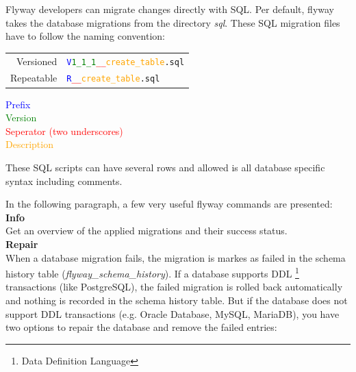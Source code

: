 

%
Flyway developers can migrate changes directly with SQL. Per default, flyway takes the database migrations from the directory \textit{sql}.
These SQL migration files have to follow the naming convention:\\

\begin{center}
\begin{tabularx}{8cm}{r l}
Versioned & \texttt{\textcolor{blue}{V}\textcolor{green}{1\_1\_1}\textcolor{red}{\_\_}\textcolor{orange}{create\_table}.sql}\\
Repeatable & \texttt{\textcolor{blue}{R}\textcolor{red}{\_\_}\textcolor{orange}{create\_table}.sql}\\
\end{tabularx}
\end{center}

\begin{flushright}
\textcolor{blue}{Prefix}\\
\textcolor{green}{Version}\\
\textcolor{red}{Seperator (two underscores)}\\
\textcolor{orange}{Description}\\
\end{flushright}

These SQL scripts can have several rows and allowed is all database specific syntax including comments.

%

%

In the following paragraph, a few very useful flyway commands are presented:\\

\textbf{Info}\\
Get an overview of the applied migrations and their success status.\\

\textbf{Repair}\\
When a database migration fails, the migration is markes as failed in the schema history table (\textit{flyway\_schema\_history}). If a database supports DDL \footnote{Data Definition Language} transactions (like PostgreSQL), the failed migration is rolled back automatically and nothing is recorded in the schema history table.  But if the database does not support DDL transactions (e.g. Oracle Database, MySQL, MariaDB), you have two options to repair the database and remove the failed entries:

